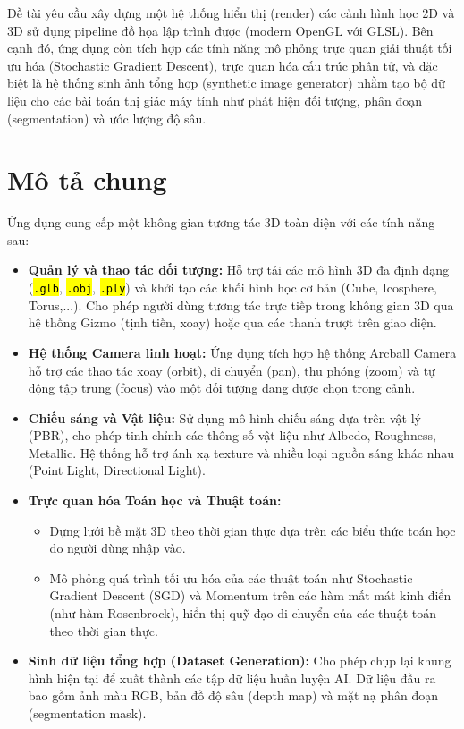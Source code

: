 \documentclass[a4paper]{article}
\newcommand{\code}[1]{\hl{\texttt{#1}}}
\begin{document}
Đề tài yêu cầu xây dựng một hệ thống hiển thị (render) các cảnh hình học 2D và 3D sử dụng pipeline đồ họa lập trình được (modern OpenGL với GLSL). Bên cạnh đó, ứng dụng còn tích hợp các tính năng mô phỏng trực quan giải thuật tối ưu hóa (Stochastic Gradient Descent), trực quan hóa cấu trúc phân tử, và đặc biệt là hệ thống sinh ảnh tổng hợp (synthetic image generator) nhằm tạo bộ dữ liệu cho các bài toán thị giác máy tính như phát hiện đối tượng, phân đoạn (segmentation) và ước lượng độ sâu.

\section{Mô tả chung}
\hspace{12pt}
Ứng dụng cung cấp một không gian tương tác 3D toàn diện với các tính năng sau:

\begin{itemize}
  \item \textbf{Quản lý và thao tác đối tượng:} Hỗ trợ tải các mô hình 3D đa định dạng (\code{.glb}, \code{.obj}, \code{.ply}) và khởi tạo các khối hình học cơ bản (Cube, Icosphere, Torus,...). Cho phép người dùng tương tác trực tiếp trong không gian 3D qua hệ thống Gizmo (tịnh tiến, xoay) hoặc qua các thanh trượt trên giao diện.
  \item \textbf{Hệ thống Camera linh hoạt:} Ứng dụng tích hợp hệ thống Arcball Camera hỗ trợ các thao tác xoay (orbit), di chuyển (pan), thu phóng (zoom) và tự động tập trung (focus) vào một đối tượng đang được chọn trong cảnh.
  \item \textbf{Chiếu sáng và Vật liệu:} Sử dụng mô hình chiếu sáng dựa trên vật lý (PBR), cho phép tinh chỉnh các thông số vật liệu như Albedo, Roughness, Metallic. Hệ thống hỗ trợ ánh xạ texture và nhiều loại nguồn sáng khác nhau (Point Light, Directional Light).
  \item \textbf{Trực quan hóa Toán học và Thuật toán:}
  \begin{itemize}
    \item Dựng lưới bề mặt 3D theo thời gian thực dựa trên các biểu thức toán học do người dùng nhập vào.
    \item Mô phỏng quá trình tối ưu hóa của các thuật toán như Stochastic Gradient Descent (SGD) và Momentum trên các hàm mất mát kinh điển (như hàm Rosenbrock), hiển thị quỹ đạo di chuyển của các thuật toán theo thời gian thực.
  \end{itemize}
  \item \textbf{Sinh dữ liệu tổng hợp (Dataset Generation):} Cho phép chụp lại khung hình hiện tại để xuất thành các tập dữ liệu huấn luyện AI. Dữ liệu đầu ra bao gồm ảnh màu RGB, bản đồ độ sâu (depth map) và mặt nạ phân đoạn (segmentation mask).
\end{itemize}
\end{document}
